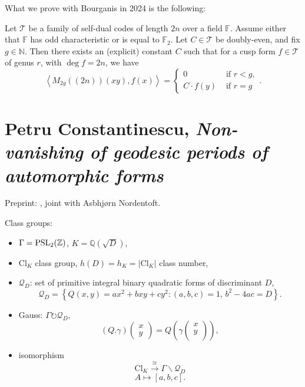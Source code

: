 \documentclass[reqno]{amsart} 
\begin{document}
What we prove with Bourganis in 2024 is the following:
\begin{theorem}
  Let $\mathcal{T}$ be a family of self-dual codes of length $2 n$ over a field $\mathbb{F}$.  Assume either that $\mathbb{F}$ has odd characteristic or is equal to $\mathbb{F}_2$.  Let $C \in \mathcal{T}$ be doubly-even, and fix $g \in \mathbb{N}$.  Then there exists an (explicit) constant $C$ such that for a cusp form $f \in \mathcal{T}$ of genus $r$, with $\deg f = 2 n$, we have
  \begin{equation*}
    \left\langle M_{2 g}((2 n))(x y), f(x) \right\rangle
    =
    \begin{cases}
      0      & \text{ if } r < g, \\
      C \cdot f(y)             & \text{ if } r = g
    \end{cases}.
  \end{equation*}
\end{theorem}

\section{Petru Constantinescu, \textnormal{\emph{Non-vanishing of geodesic periods of automorphic forms}}}
Preprint: \cite{2024arXiv2404.12982}, joint with Asbhj{\o}rn Nordentoft.

Class groups:
\begin{itemize}
\item $\Gamma = \operatorname{PSL}_2(\mathbb{Z})$, $K = \mathbb{Q}(\sqrt{D})$,
\item $\mathrm{Cl}_K$ class group, $h(D) = h_K = \lvert \mathrm{Cl}_K \rvert$ class number,
\item $\mathcal{Q}_D$: set of primitive integral binary quadratic forms of discriminant $D$,
  \begin{equation*}
    \mathcal{Q}_D = \left\{ Q(x, y)
      = a x^2 + b x y + c y^2 :(a, b, c) = 1,
      \,
      b^2 - 4 a c = D\right\}.
  \end{equation*}
\item Gauss: $\Gamma \circlearrowright \mathcal{Q}_D,$
  \begin{equation*}
    (Q . \gamma)
    \begin{pmatrix}
      x      \\
      y
    \end{pmatrix}
    = Q \left( \gamma
      \begin{pmatrix}
        x        \\
        y  \\
      \end{pmatrix} \right),
  \end{equation*}
  
\item isomorphism
  \begin{equation*}
    \mathrm{Cl}_K \xrightarrow{\cong} \Gamma \backslash \mathcal{Q}_D
  \end{equation*}
  \begin{equation*}
    A \mapsto[a, b, c].
  \end{equation*}
\end{itemize}
\end{document}
